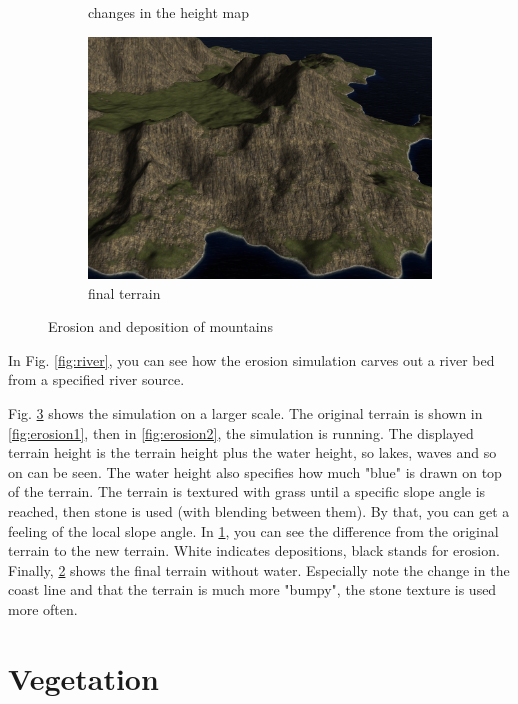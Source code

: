 \documentclass[journal, letterpaper]{IEEEtran}
\begin{document}
\begin{figure}
\begin{subfigure}[b]{0.45\textwidth}
		\caption{changes in the height map}
		\label{fig:erosion3}
	\end{subfigure}
	\begin{subfigure}[b]{0.45\textwidth}
		\includegraphics[width=\textwidth]{images/Erosion4}
		\caption{final terrain}
		\label{fig:erosion4}
	\end{subfigure}
	\caption{Erosion and deposition of mountains}\label{fig:erosion}
\end{figure}

In Fig. \ref{fig:river}, you can see how the erosion simulation carves out a river bed from a specified river source.

Fig. \ref{fig:erosion} shows the simulation on a larger scale. The original terrain is shown in \ref{fig:erosion1}, then in \ref{fig:erosion2}, the simulation is running. The displayed terrain height is the terrain height plus the water height, so lakes, waves and so on can be seen. The water height also specifies how much "blue" is drawn on top of the terrain. The terrain is textured with grass until a specific slope angle is reached, then stone is used (with blending between them). By that, you can get a feeling of the local slope angle. In \ref{fig:erosion3}, you can see the difference from the original terrain to the new terrain. White indicates depositions, black stands for erosion. Finally, \ref{fig:erosion4} shows the final terrain without water. Especially note the change in the coast line and that the terrain is much more "bumpy", the stone texture is used more often.

\section{Vegetation}\label{Vegetation}
\end{document}
